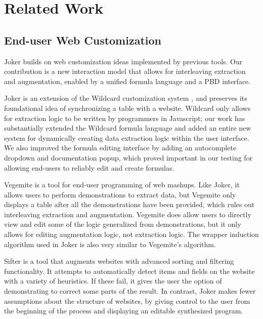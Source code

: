 \documentclass[sigconf,10pt]{acmart}
\begin{document}
\hypertarget{sec:related-work}{%
\section{Related Work}\label{sec:related-work}}

\hypertarget{end-user-web-customization}{%
\subsection{End-user Web
Customization}\label{end-user-web-customization}}

Joker builds on web customization ideas implemented by previous tools.
Our contribution is a new interaction model that allows for interleaving
extraction and augmentation, enabled by a unified formula language and a
PBD interface.

Joker is an extension of the Wildcard customization system
\citep{litt2020}, and preserves its foundational idea of synchronizing a
table with a website. Wildcard only allows for extraction logic to be
written by programmers in Javascript; our work has substantially
extended the Wildcard formula language and added an entire new system
for dynamically creating data extraction logic within the user
interface. We also improved the formula editing interface by adding an
autocomplete dropdown and documentation popup, which proved important in
our testing for allowing end-users to reliably edit and create formulas.

Vegemite \citep{lin2009} is a tool for end-user programming of web
mashups. Like Joker, it allows users to perform demonstrations to
extract data, but Vegemite only displays a table after all the
demonstrations have been provided, which rules out interleaving
extraction and augmentation. Vegemite does allow users to directly view
and edit some of the logic generalized from demonstrations, but it only
allows for editing augmentation logic, not extraction logic. The wrapper
induction algorithm used in Joker is also very similar to Vegemite's
algorithm.

Sifter \citep{huynh2006} is a tool that augments websites with advanced
sorting and filtering functionality. It attempts to automatically detect
items and fields on the website with a variety of heuristics. If these
fail, it gives the user the option of demonstrating to correct some
parts of the result. In contrast, Joker makes fewer assumptions about
the structure of websites, by giving control to the user from the
beginning of the process and displaying an editable synthesized program.
\end{document}
